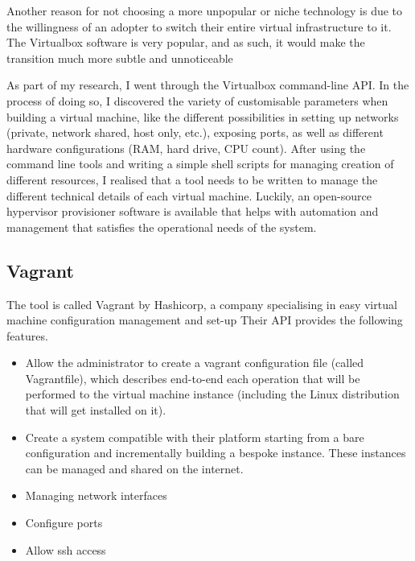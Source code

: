 \documentclass{article}
\begin{document}
Another reason for not choosing a more unpopular or niche technology is due to the willingness of an adopter to switch their entire virtual infrastructure to it. The Virtualbox software is very popular, and as such, it would make the transition much more subtle and unnoticeable 

As part of my research, I went through the Virtualbox command-line API. In the process of doing so, I discovered the variety of customisable parameters when building a virtual machine, like the different possibilities in setting up networks (private, network shared, host only, etc.), exposing ports, as well as different hardware configurations (RAM, hard drive, CPU count). After using the command line tools and writing a simple shell scripts for managing creation of different resources, I realised that a tool needs to be written to manage the different technical details of each virtual machine. Luckily, an open-source hypervisor provisioner software is available that helps with automation and management that satisfies the operational needs of the system. 

\subsection{Vagrant}
The tool is called Vagrant by Hashicorp, a company specialising in easy virtual machine configuration management and set-up Their API provides the following features.

	\begin{itemize}
		\item
			Allow the administrator to create a vagrant configuration file (called Vagrantfile), which describes end-to-end each operation that will be performed to the virtual machine instance (including the Linux distribution that will get installed on it).
		\item
			Create a system compatible with their platform starting from a bare configuration and incrementally building a bespoke instance. These instances can be managed and shared on the internet.
		\item
			Managing network interfaces
		\item
			Configure ports
		\item 
			Allow \gls{ssh} access
	\end{itemize}
\end{document}
